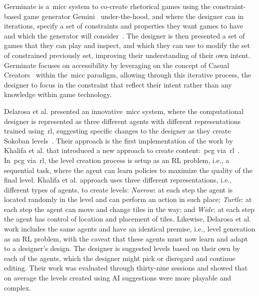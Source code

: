 Germinate is a~\acrshort{micc} system to co-create rhetorical games using the constraint-based game generator Gemini~\cite{Summerville2018-GEMINI} under-the-hood, and where the designer can in iterations, specify a set of constraints and properties they want games to have and which the generator will consider~\cite{kreminski2020-Germinate}. The designer is then presented a set of games that they can play and inspect, and which they can use to modify the set of constrained previously set, improving their understanding of their own intent. Germinate focuses on accessibility by leveraging on the concept of Casual Creators~\cite{Compton2015-CasualCreators} within the~\acrshort{micc} paradigm, allowing through this iterative process, the designer to focus in the constraint that reflect their intent rather than any knowledge within game technology. 


Delarosa et al. presented an innovative~\acrshort{micc} system, where the computational designer is represented as three different agents with different representations trained using~\acrfull{rl}, suggesting specific changes to the designer as they create Sokoban levels~\cite{delarosa2020-RLbrushMixedinit}. Their approach is the first implementation of the work by Khalifa et al. that introduced a new approach to create content:~\acrshort{pcg} via~\acrshort{rl}~\cite{khalifa2020-pcgrl}. In~\acrshort{pcg} via~\acrshort{rl}, the level creation process is setup as an RL problem, i.e., a sequential task, where the agent can learn policies to maximize the quality of the final level. Khalifa et al. approach uses three different representations, i.e., different types of agents, to create levels: \textit{Narrow}: at each step the agent is located randomly in the level and can perform an action in such place; \textit{Turtle}: at each step the agent can move and change tiles in the way; and \textit{Wide}: at each step the agent has control of location and placement of tiles. Likewise, Delarosa et al. work includes the same agents and have an identical premise, i.e., level generation as an RL problem, with the caveat that these agents must now learn and adapt to a designer's design. The designer is suggested levels based on their own by each of the agents, which the designer might pick or disregard and continue editing. Their work was evaluated through thirty-nine sessions and showed that on average the levels created using AI suggestions were more playable and complex.

